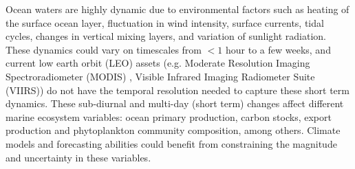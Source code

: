 \documentclass[onecolumn,3p,letterpaper,11pt]{elsarticle}
\begin{document}


Ocean waters are highly dynamic due to environmental factors such as heating of the surface ocean layer, fluctuation in wind intensity, surface currents, tidal cycles, changes in vertical mixing layers, and variation of sunlight radiation.
These dynamics could vary on timescales from $< 1$ hour to a few weeks, and current low earth orbit (LEO) assets (e.g. Moderate Resolution Imaging Spectroradiometer (MODIS) \cite{Esaias1998}, Visible Infrared Imaging Radiometer Suite (VIIRS)) do not have the temporal resolution needed to capture these short term dynamics.
These sub-diurnal and multi-day (short term) changes affect different marine ecosystem variables: ocean primary production, carbon stocks, export production and phytoplankton community composition, among others.
Climate models and forecasting abilities could benefit  from constraining the magnitude and uncertainty in these variables. 


\end{document}
